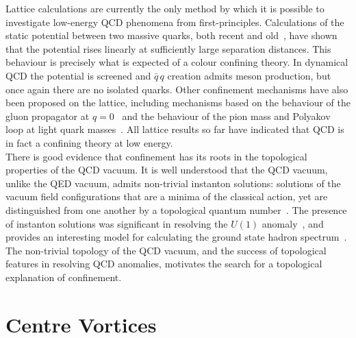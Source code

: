 Lattice calculations are currently the only method by which it is possible to investigate low-energy QCD phenomena from first-principles. Calculations of the static potential between two massive quarks, both recent and old~\cite{Born:1993cq, Bonnet:1999gt, Creutz:1980hb, DiGiacomo:1990hc}, have shown that the potential rises linearly at sufficiently large separation distances. This behaviour is precisely what is expected of a colour confining theory. In dynamical QCD the potential is screened and $\bar{q}\,q$ creation admits meson production, but once again there are no isolated quarks. Other confinement mechanisms have also been proposed on the lattice, including mechanisms based on the behaviour of the gluon propagator at $q=0$~\cite{Zwanziger:1991gz} and the behaviour of the pion mass and Polyakov loop at light quark masses~\cite{Iwasaki:1991mr}. All lattice results so far have indicated that QCD is in fact a confining theory at low energy.\\

There is good evidence that confinement has its roots in the topological properties of the QCD vacuum. It is well understood that the QCD vacuum, unlike the QED vacuum, admits non-trivial instanton solutions: solutions of the vacuum field configurations that are a minima of the classical action, yet are distinguished from one another by a topological quantum number~\cite{Belavin:1975fg}. The presence of instanton solutions was significant in resolving the $U(1)$ anomaly~\cite{tHooft:1986ooh}, and provides an interesting model for calculating the ground state hadron spectrum~\cite{Schafer:1996wv}. The non-trivial topology of the QCD vacuum, and the success of topological features in resolving QCD anomalies, motivates the search for a topological explanation of confinement. 

\section{Centre Vortices}
